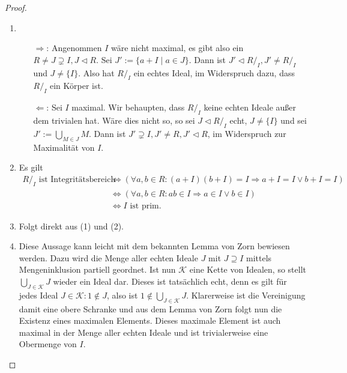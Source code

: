 \begin{proof}{\ }
    \begin{enumerate}
        \item \begin{itemize}
            \item[$\Rightarrow$:] Angenommen $I$ wäre nicht maximal, es gibt also ein $R \neq J \supsetneq I, J \vartriangleleft R$.
            Sei $J' := \{ a + I \mid a \in J \}$. Dann ist $J' \vartriangleleft R/_I, J' \neq R/_I$ und $J \neq \{I\}$. Also hat $R/_I$ ein echtes Ideal, im Widerspruch dazu, dass $R/_I$ ein Körper ist.
            \item[$\Leftarrow$:] Sei $I$ maximal. Wir behaupten, dass $R/_I$ keine echten Ideale außer dem trivialen hat. Wäre dies nicht so, so sei $J \vartriangleleft R/_I$ echt, $J \neq \{I\}$ und sei $J' := \bigcup_{M \in J} M$. Dann ist $J' \supsetneq I, J' \neq R, J' \vartriangleleft R$, im Widerspruch zur Maximalität von $I$.
        \end{itemize}
        \item Es gilt
        \begin{align*}
            R/_I \text{ ist Integritätsbereich} &\Leftrightarrow (\forall a, b \in R: (a + I)(b + I) = I \Rightarrow a + I = I \lor b + I = I) \\
            &\Leftrightarrow (\forall a, b \in R: ab \in I \Rightarrow a \in I \lor b \in I) \\
            &\Leftrightarrow I \text{ ist prim}.
        \end{align*}
        \item Folgt direkt aus (1) und (2).
        \item Diese Aussage kann leicht mit dem bekannten Lemma von Zorn bewiesen werden.
        Dazu wird die Menge aller echten Ideale $J$ mit $J\supseteq I$ mittels Mengeninklusion partiell geordnet.
        Ist nun $\mathcal{K}$ eine Kette von Idealen, so stellt $\bigcup_{J\in\mathcal{K}}J$ wieder ein Ideal dar.
        Dieses ist tatsächlich echt, denn es gilt für jedes Ideal $J\in\mathcal{K}:1\not\in J$,
        also ist $1\not\in\bigcup_{J\in\mathcal{K}}J$. Klarerweise ist die Vereinigung damit eine obere Schranke und aus dem Lemma
        von Zorn folgt nun die Existenz eines maximalen Elements. Dieses maximale Element ist auch maximal in der Menge
        aller echten Ideale und ist trivialerweise eine Obermenge von $I$.
    \end{enumerate}
\end{proof}

